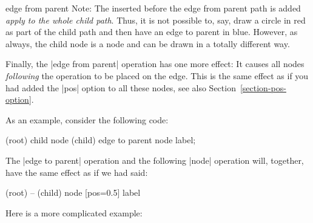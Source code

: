 \begin{pathoperation}{edge from parent}{}
  Note: The  inserted before the edge from parent path
  is added \emph{apply to the whole child path}. Thus, it is not
  possible to, say, draw a circle in red as part of the child path and
  then have an edge to parent in blue. However, as always, the child
  node is a node and can be drawn in a totally different way.

  Finally, the |edge from parent| operation has one more effect: It
  causes all nodes \emph{following} the operation to be placed on the
  edge. This is the same effect as if you had added the |pos| option
  to all these nodes, see also Section~\ref{section-pos-option}.

  As an example, consider the following code:
\begin{codeexample}
\node (root) {} child {node (child) {} edge to parent node {label}};    
\end{codeexample}
  The |edge to parent| operation and the following |node| operation
  will, together, have the same effect as if we had said:
\begin{codeexample}
(root) -- (child) node [pos=0.5] {label}
\end{codeexample}

  Here is a more complicated example:
\begin{codeexample}[]
\end{codeexample}

\end{pathoperation}



